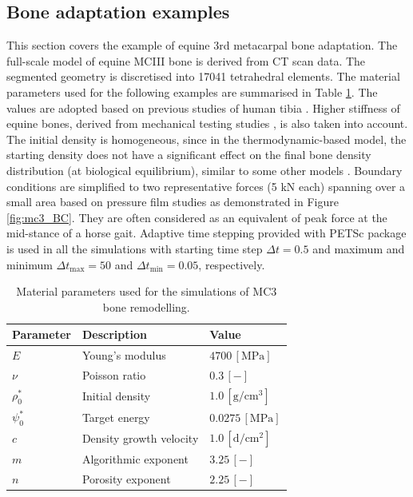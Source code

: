 \documentclass[11pt]{acmeArticle}
\numberwithin{equation}{section}
\begin{document}
\subsection{Bone adaptation examples}
\label{sec:numerical_examples:bone_adap}
This section covers the example of equine 3rd metacarpal bone adaptation. The full-scale model of equine MCIII bone is derived from CT scan data. The segmented geometry is discretised into 17041 tetrahedral elements. The material parameters used for the following examples are summarised in Table \ref{tab:parameters_mc3}. The values are adopted based on previous studies of human tibia \citep{Pang2012,Waffenschmidt2012}. Higher stiffness of equine bones, derived from mechanical testing studies \citep{Les1994}, is also taken into account. The initial density is homogeneous, since in the thermodynamic-based model, the starting density does not have a significant effect on the final bone density distribution (at biological equilibrium), similar to some other models \citep{kuhl2003theory}. %
Boundary conditions are simplified to two representative forces (5 kN each) spanning over a small area based on pressure film studies \citep{Brama2001} as demonstrated in Figure \ref{fig:mc3_BC}. They are often considered as an equivalent of peak force at the mid-stance of a horse gait. %
Adaptive time stepping provided with PETSc package \citep{petsc-web} is used in all the simulations with starting time step $\Delta t = 0.5$ and maximum and minimum $\Delta t_{\text {max}} = 50$ and $\Delta t_{\text {min}} = 0.05$, respectively.
\begin{table}[h]
	\centering
	\begin{tabular}{lll}
		\hline
		Parameter             & Description                  & Value  \\ \hline
		$E  $                 & Young's modulus              & $4700 \,\mathrm{ [MPa]}$  \citep{Les1994} \\
		$\nu  $               & Poisson ratio                & $0.3 \,\mathrm{ [-]}$ \\
		$\rho_0 ^\ast  $      & Initial density              & $1.0 \,\mathrm{[ g/cm^{3}]}$  \\
		$\psi_{0}^\ast $      & Target energy                & $0.0275\,\mathrm{ [MPa]}$   \citep{Waffenschmidt2012}  \\
		$c$                   & Density growth velocity      & $1.0 \,\mathrm{ [d/cm^{2}]}$   \\
		$m$                   & Algorithmic exponent         & $ 3.25 \,\mathrm{ [-]}$          \\
		$n$                   & Porosity exponent            & $2.25 \,\mathrm{ [-]}$      \citep{Les1994}   \\ 
		\hline
	\end{tabular} 
	\caption{Material parameters used for the simulations of MC3 bone remodelling.}
	\label{tab:parameters_mc3}
\end{table}
\end{document}
